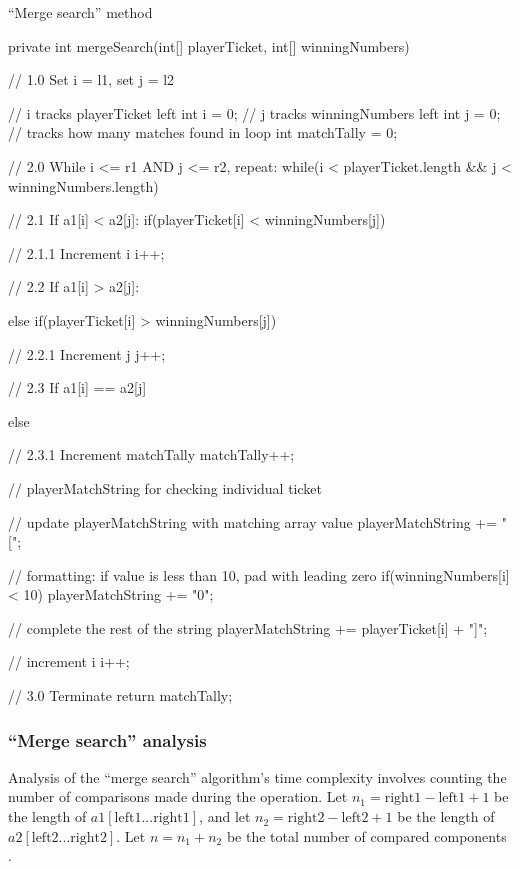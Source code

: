 \begin{listing}[H]
\caption{``Merge search'' method}
\begin{javacode}
private int mergeSearch(int[] playerTicket, int[] winningNumbers) {

    // 1.0 Set i = l1, set j = l2

    // i tracks playerTicket left
    int i = 0;
    // j tracks winningNumbers left
    int j = 0;
    // tracks how many matches found in loop
    int matchTally = 0;

    //  2.0 While i <= r1 AND j <= r2, repeat:
    while(i < playerTicket.length && j < winningNumbers.length) {

        // 2.1 If a1[i] < a2[j]:
        if(playerTicket[i] < winningNumbers[j]) {

            // 2.1.1 Increment i
            i++;

            // 2.2 If a1[i] > a2[j]:
        } else if(playerTicket[i] > winningNumbers[j]) {

            // 2.2.1 Increment j
            j++;

            // 2.3 If a1[i] == a2[j]
        } else {

            // 2.3.1 Increment matchTally
            matchTally++;

            // playerMatchString for checking individual ticket

            // update playerMatchString with matching array value
            playerMatchString += "[";

            // formatting: if value is less than 10, pad with leading zero
            if(winningNumbers[i] < 10) {
                playerMatchString += "0";
            }

            // complete the rest of the string
            playerMatchString += playerTicket[i] + "]";

            // increment i
            i++;
        }
    }

    // 3.0 Terminate
    return matchTally;
}
\end{javacode}
\end{listing}

\newpage
\subsubsection{``Merge search'' analysis}

Analysis of the ``merge search'' algorithm's time complexity involves counting the number of comparisons made during the operation. Let $n_1 = \mbox{right}1 - \mbox{left}1 + 1$ be the length of $a1[\mbox{left}1...\mbox{right}1]$, and let $n_2 = \mbox{right}2 - \mbox{left}2 + 1$ be the length of $a2[\mbox{left}2...\mbox{right}2]$. Let $n = n_1 + n_2$ be the total number of compared components \citep[p. 48]{Watt2001}.

